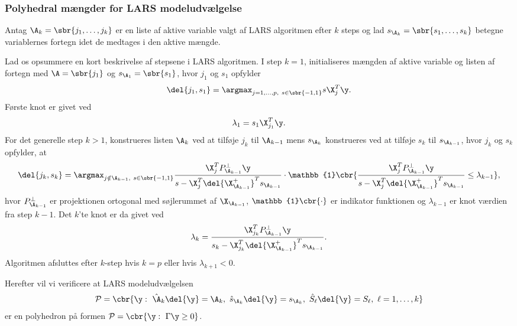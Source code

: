 \subsubsection{Polyhedral mængder for LARS modeludvælgelse}
Antag \(\A_k=\sbr{j_1, \ldots, j_k}\) er en liste af aktive variable valgt af LARS algoritmen efter \(k\) steps og lad \(s_{\A_k}=\sbr{s_1,\ldots,s_k}\) betegne variablernes fortegn idet de medtages i den aktive mængde.

Lad os opsummere en kort beskrivelse af stepsene i LARS algoritmen.
I step \(k=1\), initialiseres mængden af aktive variable og listen af fortegn med \(\A=\sbr{j_1}\) og \(s_{\A_1} = \sbr{s_1}\), hvor \(j_1\) og \(s_1\) opfylder
\begin{align}
\del{j_1, s_1} = \argmax_{j=1,\ldots, p, \ s \in \sbr{-1,1}} s \X_j^T \y. \label{eq:polyhedron_rep_LARS1}
\end{align}
Første knot er givet ved
\begin{align*}
\lambda_1 = s_1 \X_{j_1}^T \y.
\end{align*}
For det generelle step \(k > 1\), konstrueres listen \(\A_k\) ved at tilføje \(j_k\) til \(\A_{k-1}\) mens \(s_{\A_k}\) konstrueres ved at tilføje \(s_k\) til \(s_{\A_{k-1}}\), hvor \(j_k\) og \(s_k\) opfylder, at
\begin{align}
\del{j_k, s_k} = \argmax_{j \notin \A_{k-1} , \ s \in \sbr{-1,1}} \frac{\X_j^T P_{\A_{k-1}}^\perp \y}{s - \X_j^T \del{\X_{\A_{k-1}}^+}^T s_{\A_{k-1}}} \cdot \mathbb{1} \cbr{\frac{\X_j^T P_{\A_{k-1}}^\perp \y}{s - \X_j^T \del{\X_{\A_{k-1}}^+}^T s_{\A_{k-1}}} \leq \lambda_{k-1}}, \label{eq:polyhedron_rep_LARS2}
\end{align}
hvor \(P_{\A_{k-1}}^\perp \) er projektionen ortogonal med søjlerummet af \(\X_{\A_{k-1}}\), \(\mathbb{1} \cbr{\cdot}\) er indikator funktionen og \(\lambda_{k-1}\) er knot værdien fra step \(k-1\).
Det \(k\)'te knot er da givet ved
\begin{align}
\lambda_k = \frac{\X_{j_k}^T P_{\A_{k-1}}^\perp \y}{s_k - \X_{j_k}^T \del{\X_{\A_{k-1}}^+}^T s_{\A_{k-1}}}. \label{eq:polyhedron_rap_LARS3}
\end{align}
Algoritmen afsluttes efter \(k\)-step hvis \(k=p\) eller hvis \(\lambda_{k+1} < 0\).

Herefter vil vi verificere at LARS modeludvælgelsen
\begin{align}
\mathcal{P} = \cbr{\y: \ \hat{\A}_k \del{\y} = \A_k, \ \hat{s}_{\A_k} \del{\y} = s_{\A_k}, \ \hat{S}_\ell \del{\y} = S_\ell, \ \ell = 1, \ldots, k} \label{eq:post_28}
\end{align}
er en polyhedron på formen \(\mathcal{P} = \cbr{\y : \ \Gamma \y \geq 0}\).

